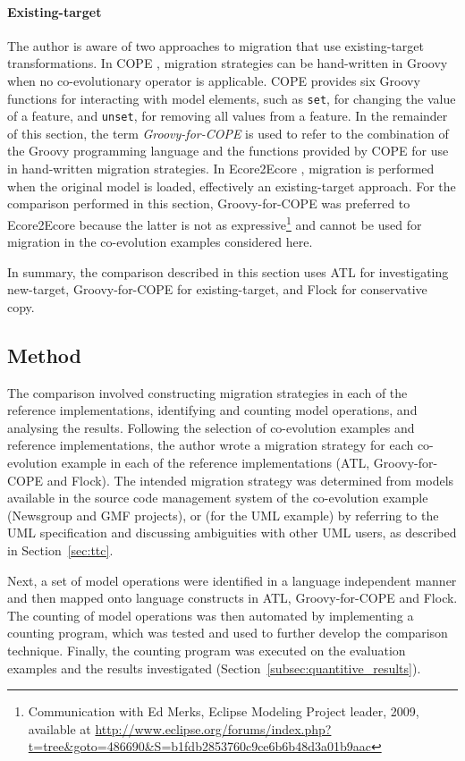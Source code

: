\paragraph{Existing-target} The author is aware of two approaches to migration that use existing-target transformations. In COPE \cite{herrmannsdoerfer09cope}, migration strategies can be hand-written in Groovy when no co-evolutionary operator is applicable. COPE provides six Groovy functions for interacting with model elements, such as \texttt{set}, for changing the value of a feature, and \texttt{unset}, for removing all values from a feature. In the remainder of this section, the term \emph{Groovy-for-COPE} is used to refer to the combination of the Groovy programming language and the functions provided by COPE for use in hand-written migration strategies. In Ecore2Ecore \cite{hussey06advanced}, migration is performed when the original model is loaded, effectively an existing-target approach. For the comparison performed in this section, Groovy-for-COPE was preferred to Ecore2Ecore because the latter is not as expressive\footnote{Communication with Ed Merks, Eclipse Modeling Project leader, 2009, available at \url{http://www.eclipse.org/forums/index.php?t=tree&goto=486690&S=b1fdb2853760c9ce6b6b48d3a01b9aac}} and cannot be used for migration in the co-evolution examples considered here.

In summary, the comparison described in this section uses ATL for investigating new-target, Groovy-for-COPE for existing-target, and Flock for conservative copy. 


\subsection{Method}
\label{subsec:quantitive_method}
The comparison involved constructing migration strategies in each of the reference implementations, identifying and counting model operations, and analysing the results. Following the selection of co-evolution examples and reference implementations, the author wrote a migration strategy for each co-evolution example in each of the reference implementations (ATL, Groovy-for-COPE and Flock). The intended migration strategy was determined from models available in the source code management system of the co-evolution example (Newsgroup and GMF projects), or (for the UML example) by referring to the UML specification and discussing ambiguities with other UML users, as described in Section~\ref{sec:ttc}.

Next, a set of model operations were identified in a language independent manner and then mapped onto language constructs in ATL, Groovy-for-COPE and Flock. The counting of model operations was then automated by implementing a counting program, which was tested and used to further develop the comparison technique. Finally, the counting program was executed on the evaluation examples and the results investigated (Section~\ref{subsec:quantitive_results}).

